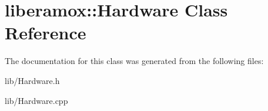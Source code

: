 \hypertarget{classliberamox_1_1Hardware}{}\section{liberamox\+:\+:Hardware Class Reference}
\label{classliberamox_1_1Hardware}


The documentation for this class was generated from the following files\+:\begin{DoxyCompactItemize}
\item 
lib/Hardware.\+h\item 
lib/Hardware.\+cpp\end{DoxyCompactItemize}
